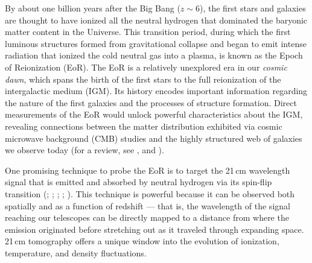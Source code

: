 \documentclass[preprint2,numberedappendix,tighten]{aastex6}  %
\begin{document}
By about one billion years after the Big Bang ($z \sim 6$), the first stars and galaxies are thought to have ionized all the 
neutral hydrogen that dominated the baryonic matter content in the Universe. This transition period, during which the first 
luminous structures formed from gravitational collapse and began to emit intense radiation that ionized the cold neutral gas 
into a plasma, is known as the Epoch of Reionization (EoR). The EoR is a relatively unexplored era in our \textit{cosmic dawn}, which spans the birth of the first stars to the full reionization of the intergalactic medium (IGM). Its 
history encodes important information regarding the nature of the first galaxies and the processes of structure formation. 
Direct measurements of the EoR would unlock powerful characteristics about the IGM, revealing connections 
between the matter distribution exhibited via cosmic microwave background (CMB) studies and the highly structured 
web of galaxies we observe today (for a review, see \citet{barkana_and_loeb2001}, \citet{furlanetto_et_al2006} and \citet{loeb_furlanetto_2013}).

One promising technique to probe the EoR is to target the 21\,cm wavelength signal that is emitted and absorbed by neutral hydrogen via 
its spin-flip transition (\citealt{furlanetto_et_al2006}; \citealt{barkana_and_loeb2008}; \citealt{morales_and_wyithe2010}; \citealt{pritchard_and_loeb2010}; \citealt{pritchard_loeb2012}). This technique is powerful because it can be observed both spatially and as a function of redshift --- that is, the wavelength 
of the signal reaching our telescopes can be directly mapped to a distance from where the emission originated before 
stretching out as it traveled through expanding space. 21\,cm tomography offers a unique window into the 
evolution of ionization, temperature, and density fluctuations.
\end{document}
